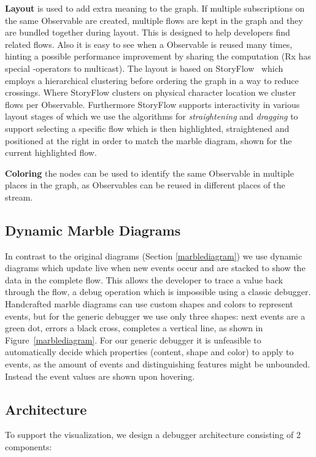 \textbf{Layout} is used to add extra meaning to the graph. If multiple subscriptions on the same Observable are created, multiple flows are kept in the graph and they are bundled together during layout. This is designed to help developers find related flows. Also it is easy to see when a Observable is reused many times, hinting a possible performance improvement by sharing the computation (Rx has special -operators to multicast). The layout is based on StoryFlow~\cite{liu2013storyflow} which employs a hierarchical clustering before ordering the graph in a way to reduce crossings. Where StoryFlow clusters on physical character location we cluster flows per Observable. Furthermore StoryFlow supports interactivity in various layout stages of which we use the algorithms for \textit{straightening} and \textit{dragging} to support selecting a specific flow which is then highlighted, straightened and positioned at the right in order to match the marble diagram, shown for the current highlighted flow.

\textbf{Coloring} the nodes can be used to identify the same Observable in multiple places in the graph, as Observables can be reused in different places of the stream.

\subsection{Dynamic Marble Diagrams}
In contrast to the original diagrams (Section \ref{marblediagram}) we use dynamic diagrams which update live when new events occur and are stacked to show the data in the complete flow. This allows the developer to trace a value back through the flow, a debug operation which is impossible using a classic debugger. Handcrafted marble diagrams can use custom shapes and colors to represent events, but for the generic debugger we use only three shapes: next events are a green dot, errors a black cross, completes a vertical line, as shown in Figure~\ref{marblediagram}. For our generic debugger it is unfeasible to automatically decide which properties (content, shape and color) to apply to events, as the amount of events and distinguishing features might be unbounded. Instead the event values are shown upon hovering.

\subsection{Architecture}
To support the visualization, we design a debugger architecture consisting of 2 components:


